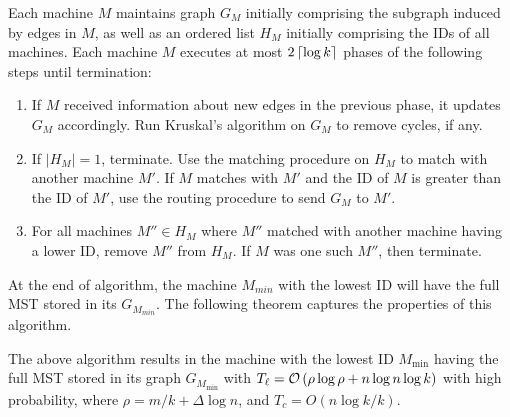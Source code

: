Each machine $M$ maintains graph $G_M$ initially comprising the subgraph induced by edges in $M$, as well as an ordered list $H_M$ initially comprising the IDs of all machines. Each machine $M$ executes at most $2 \left\lceil\log k\right\rceil$ phases of the following steps until termination:
\begin{enumerate}
    \item If $M$ received information about new edges in the previous phase, it updates $G_M$ accordingly. Run Kruskal's algorithm on $G_M$ to remove cycles, if any.
	\item If $|H_M| = 1$, terminate. Use the matching procedure on $H_M$ to match with another machine $M'$. If $M$ matches with $M'$ and the ID of $M$ is greater than the ID of $M'$, use the routing procedure to send $G_M$ to $M'$.
    \item For all machines $M'' \in H_M$ where $M''$ matched with another machine having a lower ID, remove $M''$ from $H_M$. If $M$ was one such $M''$, then terminate.
\end{enumerate}

At the end of algorithm, the machine $M_{min}$ with the lowest ID will have the full MST stored in its $G_{M_{min}}$. The following theorem captures the properties of this algorithm.

\begin{theorem}
    \label{thm:filtering-thm}
	The above algorithm results in the machine with the lowest ID $M_{\min}$ having the full MST stored in its graph $G_{M_{\min}}$ with $T_{\ell} = \mathcal{O}\left(\rho\log{\rho} + n\log{n}\log{k}\right)$ with high probability, where $\rho = m/k + \Delta \log n$, and $T_c = O(n\log k/k)$.
\end{theorem}

